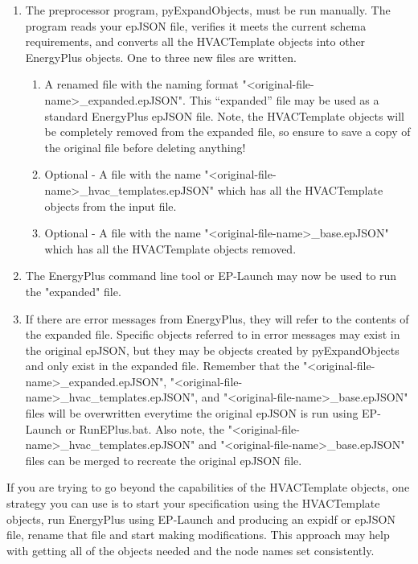 \begin{enumerate}
\def\labelenumi{\arabic{enumi})}
\item
  The preprocessor program, pyExpandObjects, must be run manually.  The program reads your epJSON file, verifies it meets the current schema requirements, and converts all the HVACTemplate objects into other EnergyPlus objects.  One to three new files are written.
  \begin{enumerate}
  \item
    A renamed file with the naming format "<original-file-name>\_expanded.epJSON". This “expanded” file may be used as a standard EnergyPlus epJSON file.  Note, the HVACTemplate objects will be completely removed from the expanded file, so ensure to save a copy of the original file before deleting anything!
  \item
    Optional - A file with the name "<original-file-name>\_hvac\_templates.epJSON" which has all the HVACTemplate objects from the input file.
  \item
    Optional - A file with the name "<original-file-name>\_base.epJSON" which has all the HVACTemplate objects removed.
  \end{enumerate}

\item
    The EnergyPlus command line tool or EP-Launch may now be used to run the "expanded" file.

\item
    If there are error messages from EnergyPlus, they will refer to the contents of the expanded file. Specific objects referred to in error messages may exist in the original epJSON, but they may be objects created by pyExpandObjects and only exist in the expanded file. Remember that the "<original-file-name>\_expanded.epJSON", "<original-file-name>\_hvac\_templates.epJSON", and "<original-file-name>\_base.epJSON" files will be overwritten everytime the original epJSON is run using EP-Launch or RunEPlus.bat.  Also note, the "<original-file-name>\_hvac\_templates.epJSON" and "<original-file-name>\_base.epJSON" files can be merged to recreate the original epJSON file.
\end{enumerate}

If you are trying to go beyond the capabilities of the HVACTemplate objects, one strategy you can use is to start your specification using the HVACTemplate objects, run EnergyPlus using EP-Launch and producing an expidf or epJSON file, rename that file and start making modifications. This approach may help with getting all of the objects needed and the node names set consistently.

